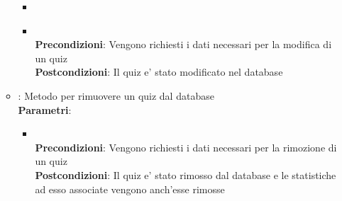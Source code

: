 \begin{itemize}
\begin{itemize}
\begin{itemize}
		\item{}\\
		\item{}\\
		\textbf{Precondizioni}: Vengono richiesti i dati necessari per la modifica di un quiz\\
		\textbf{Postcondizioni}: Il quiz e' stato modificato nel database\\
	\end{itemize}
	\item{} : Metodo per rimuovere un quiz dal database\\
	\textbf{Parametri}:
	\begin{itemize}
		\item{}\\
		\textbf{Precondizioni}: Vengono richiesti i dati necessari per la rimozione di un quiz\\
		\textbf{Postcondizioni}: Il quiz e' stato rimosso dal database e le statistiche ad esso associate vengono anch'esse rimosse\\
	\end{itemize}
\end{itemize}
\end{itemize}

